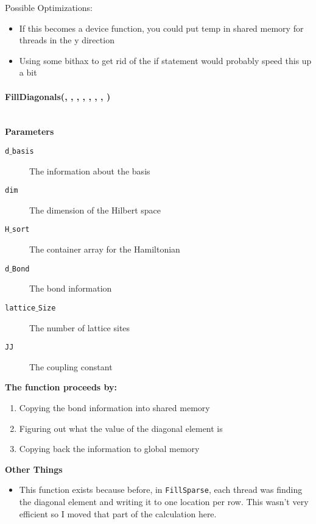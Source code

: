 \documentclass{article}
\begin{document}
Possible Optimizations:
\begin{itemize}
\item{If this becomes a device function, you could put temp in shared memory for threads in the y direction}
\item{Using some bithax to get rid of the if statement would probably speed this up a bit}
\end{itemize}

\paragraph{\cudaglobal \void FillDiagonals(\ptrint , \int , \ptrint , \ptrint , \cuDoubleComplex , \ptrint , \int , \double) \\ \\}
\noindent\textbf{Parameters}
\begin{description}
\item[\ptrint \texttt{d$\_$basis}] The information about the basis
\item[\int \texttt{dim}] The dimension of the Hilbert space
\item[\hamstruct \texttt{H$\_$sort}] The container array for the Hamiltonian
\item[\ptrint \texttt{d$\_$Bond}] The bond information
\item[\int \texttt{lattice$\_$Size}] The number of lattice sites
\item[\double \texttt{JJ}] The coupling constant
\end{description}

\textbf{The function proceeds by:}
\begin{enumerate}
\item{Copying the bond information into shared memory}
\item{Figuring out what the value of the diagonal element is}
\item{Copying back the information to global memory}
\end{enumerate}

\textbf{Other Things}
\begin{itemize}
\item{This function exists because before, in \texttt{FillSparse}, each thread was finding the diagonal element and writing it to one location per row. This wasn't very efficient so I moved that part of the calculation here.}
\end{itemize}
\end{document}
